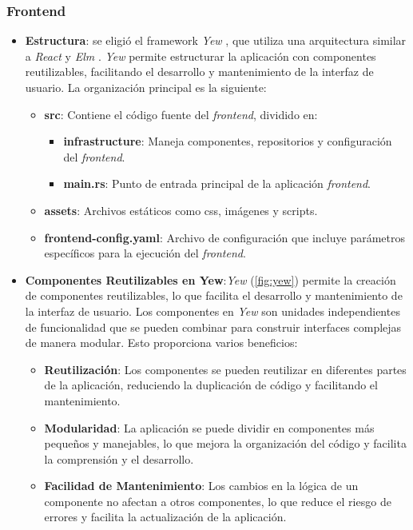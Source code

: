 \subsubsection*{Frontend}
\begin{itemize}
        \item \textbf{Estructura}: se eligió el framework \textit{Yew} \cite{yew}, que utiliza una arquitectura similar a \textit{React} \cite{react} y \textit{Elm} \cite{elm_components}. \textit{Yew} permite estructurar la aplicación con componentes reutilizables, facilitando el desarrollo y mantenimiento de la interfaz de usuario. La organización principal es la siguiente:
    \begin{itemize}
        \item \textbf{src}: Contiene el código fuente del \textit{frontend}, dividido en:
        \begin{itemize}
            \item \textbf{infrastructure}: Maneja componentes, repositorios y configuración del \textit{frontend}.
            \item \textbf{main.rs}: Punto de entrada principal de la aplicación \textit{frontend}.
        \end{itemize}
        \item \textbf{assets}: Archivos estáticos como \ac{css}, imágenes y scripts.
        \item \textbf{frontend-config.yaml}: Archivo de configuración que incluye parámetros específicos para la ejecución del \textit{frontend}.
    \end{itemize}
    \item \textbf{Componentes Reutilizables en Yew}:\textit{Yew} (\autoref{fig:yew}) permite la creación de componentes reutilizables, lo que facilita el desarrollo y mantenimiento de la interfaz de usuario. Los componentes en \textit{Yew} son unidades independientes de funcionalidad que se pueden combinar para construir interfaces complejas de manera modular. Esto proporciona varios beneficios:
    \begin{itemize}
        \item \textbf{Reutilización}: Los componentes se pueden reutilizar en diferentes partes de la aplicación, reduciendo la duplicación de código y facilitando el mantenimiento.
        \item \textbf{Modularidad}: La aplicación se puede dividir en componentes más pequeños y manejables, lo que mejora la organización del código y facilita la comprensión y el desarrollo.
        \item \textbf{Facilidad de Mantenimiento}: Los cambios en la lógica de un componente no afectan a otros componentes, lo que reduce el riesgo de errores y facilita la actualización de la aplicación.

\end{itemize}
\end{itemize}
